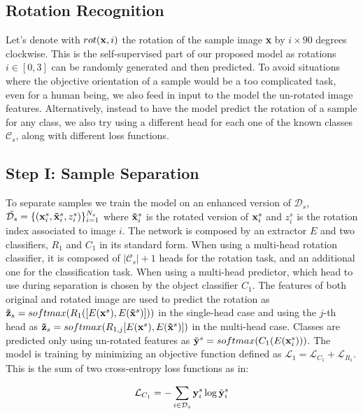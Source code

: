 \documentclass[10pt,twocolumn,letterpaper]{article}
\begin{document}
\subsection{Rotation Recognition}

Let's denote with $rot({\bf x}, i)$ the rotation of the sample image {\bf x} by $i\times 90$ degrees clockwise.
This is the self-supervised part of our proposed model as rotations $i \in [0, 3]$ can be randomly generated and then predicted.
To avoid situations where the objective orientation of a sample would be a too complicated task, even for a human being, we also feed in input to the model the un-rotated image features.
Alternatively, instead to have the model predict the rotation of a sample for any class, we also try using a different head for each one of the known classes $\mathcal{C}_s$, along with different loss functions.

\subsection{Step I: Sample Separation}

To separate samples we train the model on an enhanced version of $\mathcal{D}_s$, $\tilde{\mathcal{D}_s} = \{({\bf x}_i^s, {\bf \tilde x}_i^s, z_i^s)\}_{i=1}^{N_s}$ where ${\bf \tilde x}_i^s$ is the rotated version of ${\bf x}_i^s$ and $z_i^s$ is the rotation index associated to image $i$.
The network is composed by an extractor $E$ and two classifiers, $R_1$ and $C_1$ in its standard form.
When using a multi-head rotation classifier, it is composed of $|\mathcal{C}_s|+1$ heads for the rotation task, and an additional one for the classification task.
When using a multi-head predictor, which head to use during separation is chosen by the object classifier $C_1$.
The features of both original and rotated image are used to predict the rotation as ${\bf \tilde z}_s = softmax(R_1([E({\bf x}^s), E({\bf\tilde x}^s)]))$ in the single-head case and using the $j$-th head as ${\bf\tilde{z}}_s = softmax(R_{1,j}[E({\bf x}^s), E({\bf\tilde{x}}^s)])$ in the multi-head case.
Classes are predicted only using un-rotated features as $\tilde{\bf y}^s = softmax(C_1(E({\bf x}_i^s)))$.
The model is training by minimizing an objective function defined as $\mathcal{L}_1 = \mathcal{L}_{C_1} + \mathcal{L}_{R_1}$.
This is the sum of two cross-entropy loss functions as in:

\begin{equation}
  \mathcal{L}_{C_1} = -\sum_{i\in\mathcal{D}_s} {\bf y}_i^s \log \tilde{\bf y}_i^s
  \label{eq:baseloss_class}
\end{equation}
\end{document}
